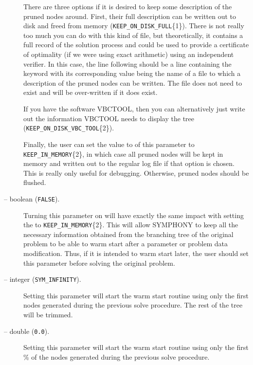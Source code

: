 \begin{description}
There are three options if it is desired to keep some description of
the pruned nodes around. First, their full description can be written
out to disk and freed from memory ({\tt KEEP\_ON\_DISK\_FULL}\{1\}). There
is not really too much you can do with this kind of file, but
theoretically, it contains a full record of the solution process and
could be used to provide a certificate of optimality (if we were using
exact arithmetic) using an independent verifier. In this case, the
line following  should be a line
containing the keyword  with its
corresponding value being the name of a file to which a description of
the pruned nodes can be written. The file does not need to exist and
will be over-written if it does exist.

If you have the software VBCTOOL, then
you can alternatively just write out the information VBCTOOL needs to
display the tree ({\tt KEEP\_ON\_DISK\_VBC\_TOOL}\{2\}). 

Finally, the user can set the value to of this parameter to {\tt
KEEP\_IN\_MEMORY}\{2\}, in which case all pruned nodes will be kept in
memory and written out to the regular log file if that option is
chosen. This is really only useful for debugging. Otherwise, pruned
nodes should be flushed.

\item[\ptt{keep\_warm\_start} -- boolean ({\tt FALSE}).]
Turning this parameter on will have exactly the same impact with 
setting the  to 
{\tt KEEP\_IN\_MEMORY}\{2\}. This will allow SYMPHONY to keep all the
necessary information obtained from the branching tree of the original 
problem to be able to warm start after a parameter or problem data 
modification. Thus, if it is intended to warm start later, the user 
should set this parameter before solving the original problem.

\item[\ptt{warm\_start\_node\_limit} -- integer ({\tt SYM\_INFINITY}).]
Setting this parameter will start the warm start routine using only the 
first  nodes generated during the 
previous solve procedure. The rest of the tree will be trimmed. 

\item[\ptt{warm\_start\_node\_ratio} -- double ({\tt 0.0}).]
Setting this parameter will start the warm start routine using only the 
first \% of the nodes generated during the 
previous solve procedure. 


\end{description}
